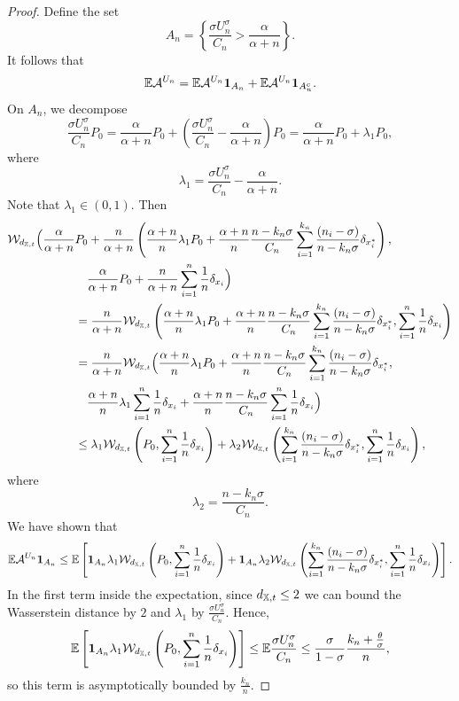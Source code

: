 \begin{proof}
    Define the set 
    \[
    A_n = \left\{ \frac{ \sigma U_n^\sigma}{C_n} > \frac{\alpha}{\alpha + n}\right\}.
    \]
    It follows that
    \[
    \mathbb{E} \mathcal{A}^{U_n} = \mathbb{E} \mathcal{A}^{U_n}\mathbf{1}_{A_n} + \mathbb{E} \mathcal{A}^{U_n}\mathbf{1}_{A^c_n}.
    \]
    On $A_n$, we decompose
    \[
    \frac{ \sigma U_n^\sigma}{C_n} P_0 = \frac{\alpha}{\alpha + n}P_0 + \left( \frac{ \sigma U_n^\sigma}{C_n} - \frac{\alpha}{\alpha + n} \right) P_0 = \frac{\alpha}{\alpha + n}P_0 + \lambda_1 P_0,
    \]
    where
    \[
    \lambda_1 = \frac{ \sigma U_n^\sigma}{C_n} - \frac{\alpha}{\alpha + n}.
    \]    
    Note that $\lambda_1 \in (0,1)$. Then
    \begin{align*}
        \mathcal{W}_{d_{\mathbb{X},t}} \Big(\frac{\alpha}{\alpha + n}&P_0 +  \frac{n}{\alpha + n} \left( \frac{\alpha + n}{n}\lambda_1 P_0 + \frac{\alpha + n}{n}\frac{n-k_n\sigma}{C_n}\sum_{i = 1}^{k_n}\frac{\left(n_i - \sigma\right)}{n-k_n\sigma} \delta_{x_i^*} \right), \\
        & \quad \frac{\alpha}{\alpha + n}P_0 + \frac{n}{\alpha + n}\sum_{i = 1}^n\frac{1}{n}\delta_{x_i}\Big) \\
        & = \frac{n}{\alpha + n}\mathcal{W}_{d_{\mathbb{X},t}} \left( \frac{\alpha + n}{n}\lambda_1 P_0 + \frac{\alpha + n}{n}\frac{n-k_n\sigma}{C_n}\sum_{i = 1}^{k_n}\frac{\left(n_i - \sigma\right)}{n-k_n\sigma}\delta_{x_i^*}, \sum_{i = 1}^n \frac{1}{n}\delta_{x_i}\right) \\ 
        & = \frac{n}{\alpha + n}\mathcal{W}_{d_{\mathbb{X},t}} \Big( \frac{\alpha + n}{n}\lambda_1 P_0 + \frac{\alpha + n}{n}\frac{n-k_n\sigma}{C_n}\sum_{i = 1}^{k_n}\frac{\left(n_i - \sigma \right)}{n-k_n\sigma}\delta_{x_i^*}, \\
        & \quad \frac{\alpha + n}{n}\lambda_1\sum_{i = 1}^n\frac{1}{n}\delta_{x_i} + \frac{\alpha + n}{n}\frac{n-k_n\sigma}{C_n}\sum_{i = 1}^n\frac{1}{n}\delta_{x_i}\Big) \\
        & \leq \lambda_1 \mathcal{W}_{d_{\mathbb{X},t}}\left(P_0, \sum_{i = 1}^n \frac{1}{n}\delta_{x_i}\right) + \lambda_2\mathcal{W}_{d_{\mathbb{X},t}} \left( \sum_{i = 1}^{k_n} \frac{(n_i-\sigma)}{n-k_n\sigma}\delta_{x_i^*},\sum_{i = 1}^n\frac{1}{n}\delta_{x_i}\right),
    \end{align*}
    where 
    \[
    \lambda_2 = \frac{n - k_n \sigma}{C_n}.
    \]
    We have shown that
    \[
    \mathbb{E} \mathcal{A}^{U_n}\mathbf{1}_{A_n} \leq \mathbb{E} \left[ \mathbf{1}_{A_n}\lambda_1 \mathcal{W}_{d_{\mathbb{X},t}}\left(P_0, \sum_{i = 1}^n \frac{1}{n}\delta_{x_i}\right) +  \mathbf{1}_{A_n}\lambda_2\mathcal{W}_{d_{\mathbb{X},t}} \left( \sum_{i = 1}^{k_n} \frac{(n_i-\sigma)}{n-k_n\sigma}\delta_{x_i^*},\sum_{i = 1}^n\frac{1}{n}\delta_{x_i}\right) \right].
    \]
    In the first term inside the expectation, since $d_{\mathbb{X},t} \leq 2$ we can bound the Wasserstein distance by $2$ and $\lambda_1$ by $\frac{ \sigma U_n^\sigma}{C_n}$. Hence,
    \[
    \mathbb{E} \left[ \mathbf{1}_{A_n}\lambda_1 \mathcal{W}_{d_{\mathbb{X},t}}\left(P_0, \sum_{i = 1}^n \frac{1}{n}\delta_{x_i}\right)\right]\leq \mathbb{E} \frac{ \sigma U_n^\sigma}{C_n} \leq \frac{\sigma}{1-\sigma}\frac{k_n + \frac{\theta}{\sigma}}{n},
    \]
    so this term is asymptotically bounded by $\frac{k_n}{n}$.
    

\end{proof}

